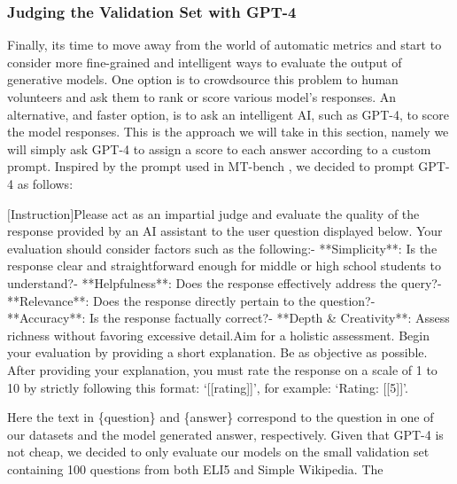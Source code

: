 \documentclass[11pt, oneside]{article}   	%
\begin{document}
\subsubsection{Judging the Validation Set with GPT-4}
Finally, its time to move away from the world of automatic metrics and start to consider more fine-grained and intelligent ways to evaluate the output of generative models.
One option is to crowdsource this problem to human volunteers and ask them to rank or score various model's responses.
An alternative, and faster option, is to ask an intelligent AI, such as GPT-4, to score the model responses. 
This is the approach we will take in this section, namely we will simply ask GPT-4 to assign a score to each answer according to a custom prompt.
Inspired by the prompt used in MT-bench \cite{zheng2023judging}, we decided to prompt GPT-4 as follows:
\\
\begin{displayquote}
$[$Instruction$]$\newline Please act as an impartial judge and
    evaluate the quality of the response provided by an AI assistant
    to the user question displayed below. Your evaluation should consider
    factors such as the following:\newline\newline- **Simplicity**: Is the response
    clear and straightforward enough for middle or high school students to
    understand?\newline- **Helpfulness**: Does the response effectively address
    the query?\newline- **Relevance**: Does the response directly pertain to the
    question?\newline- **Accuracy**: Is the response factually correct?\newline-
    **Depth \& Creativity**: Assess richness without favoring excessive
    detail.\newline\newline Aim for a holistic assessment. Begin your evaluation by
    providing a short explanation. Be as objective as possible. After
    providing your explanation, you must rate the response on a scale
    of 1 to 10 by strictly following this format: `[[rating]]',
    for example: `Rating: [[5]]'.\newline\newline[Question]\newline{}
\end{displayquote}
Here the text in \{question\} and \{answer\} correspond to the question in one of our datasets and the model generated answer, respectively.
Given that GPT-4 is not cheap, we decided to only evaluate our models on the small validation set containing 100 questions from both ELI5 and Simple Wikipedia. The   
\end{document}
